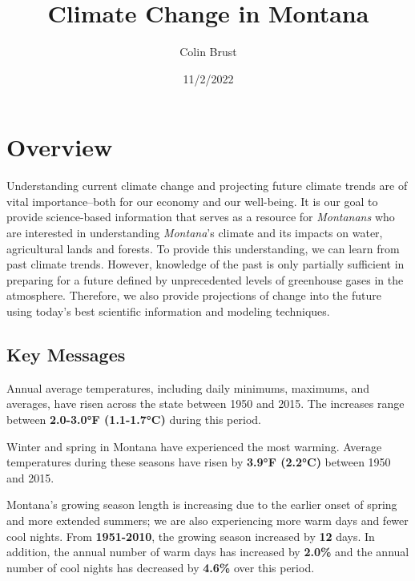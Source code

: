 \documentclass[
  letterpaper,
]{scrreprt}\usepackage{amsmath,amssymb}
\title{Climate Change in Montana}
\author{Colin Brust}
\date{11/2/2022}
\renewcommand*\contentsname{Table of contents}
\newcommand\contentsname{Table of contents}
\begin{document}
\maketitle

\ifdefined\Shaded\renewenvironment{Shaded}{\begin{tcolorbox}[interior hidden, borderline west={3pt}{0pt}{shadecolor}, breakable, boxrule=0pt, frame hidden, enhanced, sharp corners]}{\end{tcolorbox}}\fi

\renewcommand*\contentsname{Table of contents}
{
\hypersetup{linkcolor=}
\setcounter{tocdepth}{2}
\tableofcontents
}
\hypertarget{overview}{%
\chapter*{Overview}\label{overview}}

Understanding current climate change and projecting future climate
trends are of vital importance--both for our economy and our well-being.
It is our goal to provide science-based information that serves as a
resource for \emph{Montanans} who are interested in understanding
\emph{Montana}'s climate and its impacts on water, agricultural lands
and forests. To provide this understanding, we can learn from past
climate trends. However, knowledge of the past is only partially
sufficient in preparing for a future defined by unprecedented levels of
greenhouse gases in the atmosphere. Therefore, we also provide
projections of change into the future using today's best scientific
information and modeling techniques.

\hypertarget{key-messages}{%
\section*{Key Messages}\label{key-messages}}

Annual average temperatures, including daily minimums, maximums, and
averages, have risen across the state between 1950 and 2015. The
increases range between \textbf{2.0-3.0°F (1.1-1.7°C)} during this
period.

Winter and spring in Montana have experienced the most warming. Average
temperatures during these seasons have risen by \textbf{3.9°F (2.2°C)}
between 1950 and 2015.

Montana's growing season length is increasing due to the earlier onset
of spring and more extended summers; we are also experiencing more warm
days and fewer cool nights. From \textbf{1951-2010}, the growing season
increased by \textbf{12} days. In addition, the annual number of warm
days has increased by \textbf{2.0\%} and the annual number of cool
nights has decreased by \textbf{4.6\%} over this period.
\end{document}
